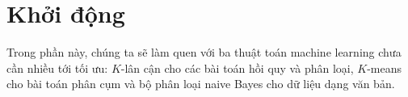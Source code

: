 \part{Khởi động}
\label{part:warmup}
Trong phần này, chúng ta sẽ làm quen với ba thuật toán machine learning chưa cần
nhiều tới tối ưu: $K$-lân cận cho các bài toán hồi quy và phân loại, $K$-means cho bài toán phân cụm và bộ phân loại naive Bayes cho dữ liệu dạng văn bản. 
